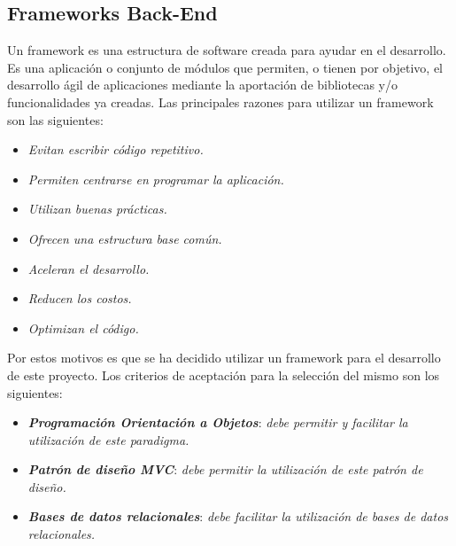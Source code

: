 \documentclass[11pt,oneside]{book}
\begin{document}
\subsection{Frameworks Back-End}
Un framework es una estructura de software creada para ayudar en el desarrollo. Es una aplicación o conjunto de módulos que permiten, o tienen por objetivo, el desarrollo ágil de aplicaciones mediante la aportación de bibliotecas y/o funcionalidades ya creadas. Las principales razones para utilizar un framework son las siguientes:
\begin{itemize}
\item \textit{Evitan escribir código repetitivo.}
\item \textit{Permiten centrarse en programar la aplicación.}
\item \textit{Utilizan buenas prácticas.}
\item \textit{Ofrecen una estructura base común.}
\item \textit{Aceleran el desarrollo.}
\item \textit{Reducen los costos.}
\item \textit{Optimizan el código.}
\end{itemize}

Por estos motivos es que se ha decidido utilizar un framework para el desarrollo de este proyecto. Los criterios de aceptación para la selección del mismo son los siguientes:
\begin{itemize}
\item \textit{\textbf{Programación Orientación a Objetos}}: \textit{debe permitir y facilitar la utilización de este paradigma.}
\item \textit{\textbf{Patrón de diseño MVC}}: \textit{debe permitir la utilización de este patrón de diseño.}
\item \textit{\textbf{Bases de datos relacionales}}: \textit{debe facilitar la utilización de bases de datos relacionales.}
\end{itemize}
\end{document}
